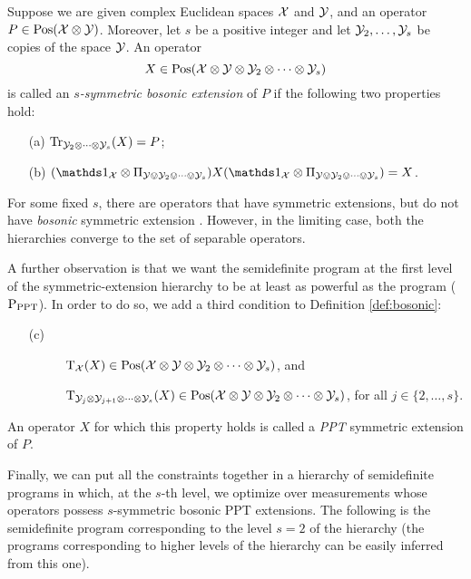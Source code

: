 \begin{definition}
\label{def:bosonic}
  Suppose we are given complex Euclidean spaces $\mathcal{X}$ and $\mathcal{Y}$, and an operator
  $P\in\mathrm{Pos}(\mathcal{X}\otimes\mathcal{Y})$. Moreover, let $s$ be a positive integer and let 
  $\mathcal{Y}_{2},\ldots,\mathcal{Y}_{s}$ be copies of the space $\mathcal{Y}$. An operator 
  \begin{equation}
    X \in \mathrm{Pos}(\mathcal{X}\otimes\mathcal{Y}\otimes\mathcal{Y}_{2}\otimes\cdots\otimes\mathcal{Y}_{s})
  \end{equation}
  is called an \emph{$s$-symmetric bosonic extension} of $P$ if the following 
  two properties hold:
  \begin{itemize}
    \item[(a)] $\operatorname{Tr}_{\mathcal{Y}_{2}\otimes\cdots\otimes\mathcal{Y}_{s}}(X) = P$;
    \item[(b)] $(\I_{\X}\otimes \Pi_{\Y\ovee\Y_{2}\ovee\cdots\ovee\Y_{s}})X
                (\I_{\X}\otimes \Pi_{\Y\ovee\Y_{2}\ovee\cdots\ovee\Y_{s}}) = X$.
  \end{itemize}
\end{definition}

For some fixed $s$, there are operators that have symmetric extensions, 
but do not have \emph{bosonic} symmetric extension \cite{Myhr09}.
However, in the limiting case, both the hierarchies converge to the set of separable operators.

A further observation is that we want the semidefinite program at the first level 
of the symmetric-extension hierarchy to be at least as powerful as the program 
($\textup{P}_{\mathrm{PPT}}$). In order to do so, we add a third condition to Definition 
\ref{def:bosonic}:
  \begin{itemize}
    \item[(c)] 
      \begin{description}
        \item[] $\operatorname{T}_{\mathcal{X}}(X) \in \mathrm{Pos}(\mathcal{X}\otimes\mathcal{Y}\otimes\mathcal{Y}_{2}\otimes\cdots\otimes\mathcal{Y}_{s})$, and
        \item[] $\operatorname{T}_{\mathcal{Y}_{j}\otimes\mathcal{Y}_{j+1}\otimes\cdots\otimes\mathcal{Y}_{s}}(X) \in 
      \mathrm{Pos}(\mathcal{X}\otimes\mathcal{Y}\otimes\mathcal{Y}_{2}\otimes\cdots\otimes\mathcal{Y}_{s})$, 
      for all $j \in \{2, \ldots, s\}$.
      \end{description}
  \end{itemize}
An operator $X$ for which this property holds is called a \emph{PPT} symmetric
extension of $P$.

Finally, we can put all the constraints together in a hierarchy of semidefinite programs 
in which, at the $s$-th level, we optimize over measurements whose operators possess 
$s$-symmetric bosonic PPT extensions. 
The following is the semidefinite program corresponding to the level $s = 2$ of 
the hierarchy (the programs corresponding to higher levels of the hierarchy can 
be easily inferred from this one).

